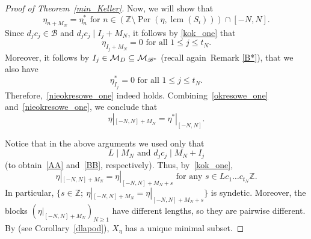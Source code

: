 \documentclass[leqno,a4paper,12pt]{article}
\DeclareMathOperator{\lcm}{lcm}
\theoremstyle{definition}
\newcommand{\divides}{\mid}
\newcommand{\Per}{\operatorname{Per}\nolimits}
\newcommand{\cm}{{\cal M}}
\newcommand{\Z}{{\mathbb{Z}}}
\newcommand{\sB}{\mathscr{B}}
\begin{document}
\begin{proof}[Proof of Theorem~\ref{min_Keller}]
Now, we will show that
\begin{equation}\label{nieokresowe_one}
\eta_{n+M_N}=\eta^*_n \text{ for }n\in(\Z\setminus\Per(\eta,\lcm(S_i)))\cap [-N,N].
\end{equation}
Since $d_jc_j\in\sB$ and $d_jc_j\divides I_j+M_N$, it follows by \eqref{kok_one} that
\begin{equation}\label{BB}
\eta_{I_j+M_N}=0 \text{ for all }1\leq j\leq t_N.
\end{equation}
Moreover, it follows by $I_j\in\cm_D\subseteq \cm_{\sB^*}$ (recall again~Remark \ref{B*}), that we also have
\begin{equation*}
\eta^*_{I_j}=0\text{ for all }1\leq j\leq t_N.
\end{equation*}
Therefore,~\eqref{nieokresowe_one} indeed holds. Combining~\eqref{okresowe_one} and~\eqref{nieokresowe_one}, we conclude that
\begin{equation}\label{etai*_one}
\eta|_{[-N,N]+M_N}=\eta^*|_{[-N,N]}.
\end{equation}

Notice that in the above arguments we used only that
\[
L\divides M_N \text{ and }d_jc_j\divides M_N+I_j
\]
(to obtain~\eqref{AA} and~\eqref{BB}, respectively). Thus, by~\eqref{kok_one},
\[
\eta|_{[-N,N]+M_N}=\eta|_{[-N,N]+M_N+s} \text{ for any }s\in Lc_1\ldots c_{t_N}\Z.
\]
In particular, $\{s\in\Z;\ \eta|_{[-N,N]+M_N}=\eta|_{[-N,N]+M_N+s}\}$ is syndetic. Moreover, the blocks $(\eta|_{[-N,N]+M_N})_{N\geq1}$ have different lengths, so they are pairwise different. By \cite[Corollary 2.17]{MR3803141} (see Corollary~\ref{dlapod}), $X_\eta$ has a unique minimal subset.
\end{proof}
\end{document}
